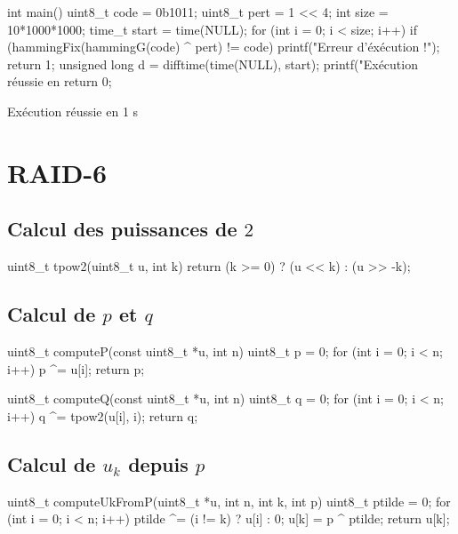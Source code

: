 \documentclass[a4paper,french,bookmarks]{article}
\begin{document}
    \begin{C}
int main() {
    uint8_t code = 0b1011;
    uint8_t pert = 1 << 4;
    int size = 10*1000*1000;
    time_t start = time(NULL);
    for (int i = 0; i < size; i++)
        if (hammingFix(hammingG(code) ^ pert)
        != code) {
            printf("Erreur d'éxécution !\n");
            return 1;
    }
    unsigned long d = difftime(time(NULL), start);
    printf("Exécution réussie en %
    return 0;
}
    \end{C}

    \medskip
    
    \begin{outputlog}
Exécution réussie en 1 s
    \end{outputlog}

\newpage 
\section{RAID-6}

    \subsection{Calcul des puissances de $2$}

    \begin{C}
uint8_t tpow2(uint8_t u, int k)
{
    return (k >= 0) ? (u << k) : (u >> -k);
}
    \end{C}

    \subsection{Calcul de $p$ et $q$}

    \begin{C}
uint8_t computeP(const uint8_t *u, int n)
{
    uint8_t p = 0;
    for (int i = 0; i < n; i++) p ^= u[i];
    return p;
}

uint8_t computeQ(const uint8_t *u, int n)
{
    uint8_t q = 0;
    for (int i = 0; i < n; i++)
        q ^= tpow2(u[i], i);
    return q;
}
    \end{C}

    \subsection{Calcul de $u_k$ depuis $p$}

    \begin{C}
uint8_t computeUkFromP(uint8_t *u, int n,
    int k, int p)
{
    uint8_t ptilde = 0;
    for (int i = 0; i < n; i++)
        ptilde ^= (i != k) ? u[i] : 0;
    u[k] = p ^ ptilde;
    return u[k];
}
    \end{C}
\end{document}
